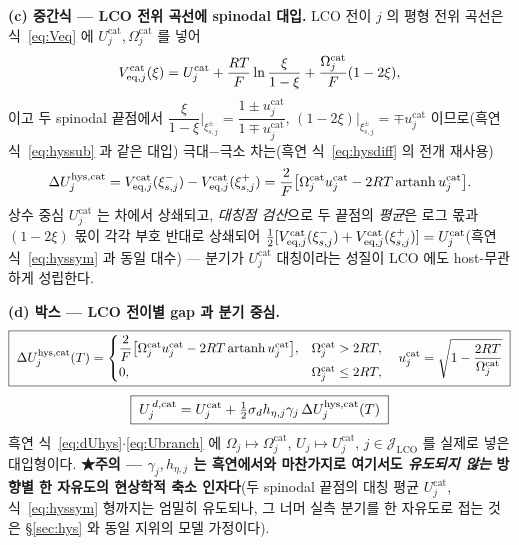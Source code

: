 \textbf{(c) 중간식 --- LCO 전위 곡선에 spinodal 대입.}
LCO 전이 $j$ 의 평형 전위 곡선은 식~\eqref{eq:Veq} 에 $U_j^\mathrm{cat},\Omega_j^\mathrm{cat}$ 를 넣어
\begin{equation}
V_{\mathrm{eq},j}^\mathrm{cat}(\xi)=U_j^\mathrm{cat}
+\frac{RT}{F}\ln\frac{\xi}{1-\xi}+\frac{\Omega_j^\mathrm{cat}}{F}(1-2\xi),
\label{eq:lco-Veq}
\end{equation}
이고 두 spinodal 끝점에서 $\dfrac{\xi}{1-\xi}\Big|_{\xi_{s,j}^\pm}=\dfrac{1\pm u_j^\mathrm{cat}}{1\mp
u_j^\mathrm{cat}}$, $(1-2\xi)\big|_{\xi_{s,j}^\pm}=\mp u_j^\mathrm{cat}$ 이므로(흑연 식~\eqref{eq:hyssub}
과 같은 대입) 극대$-$극소 차는(흑연 식~\eqref{eq:hysdiff} 의 전개 재사용)
\[
\Delta U_{j}^{\mathrm{hys},\mathrm{cat}}=V_{\mathrm{eq},j}^\mathrm{cat}(\xi_{s,j}^-)-V_{\mathrm{eq},j}^\mathrm{cat}(\xi_{s,j}^+)
=\frac{2}{F}\big[\Omega_j^\mathrm{cat}u_j^\mathrm{cat}-2RT\,\mathrm{artanh}\,u_j^\mathrm{cat}\big].
\]
상수 중심 $U_j^\mathrm{cat}$ 는 차에서 상쇄되고, \emph{대칭점 검산}으로 두 끝점의 \emph{평균}은 로그 몫과
$(1-2\xi)$ 몫이 각각 부호 반대로 상쇄되어 $\tfrac12[V_{\mathrm{eq},j}^\mathrm{cat}(\xi_{s,j}^-)
+V_{\mathrm{eq},j}^\mathrm{cat}(\xi_{s,j}^+)]=U_j^\mathrm{cat}$(흑연 식~\eqref{eq:hyssym} 과 동일 대수) ---
분기가 $U_j^\mathrm{cat}$ 대칭이라는 성질이 LCO 에도 host-무관하게 성립한다.

\textbf{(d) 박스 --- LCO 전이별 gap 과 분기 중심.}
\begin{equation}
\boxed{\;
\Delta U_j^{\mathrm{hys},\mathrm{cat}}(T)=
\begin{cases}
\dfrac{2}{F}\big[\Omega_j^\mathrm{cat}u_j^\mathrm{cat}-2RT\,\mathrm{artanh}\,u_j^\mathrm{cat}\big],
& \Omega_j^\mathrm{cat}>2RT,\\[4pt]
0, & \Omega_j^\mathrm{cat}\le2RT,
\end{cases}
\quad u_j^\mathrm{cat}=\sqrt{1-\dfrac{2RT}{\Omega_j^\mathrm{cat}}}\;}
\label{eq:lco-dUhys}
\end{equation}
\begin{equation}
\boxed{\;
U_j^{\,d,\mathrm{cat}}=U_j^\mathrm{cat}
+\tfrac12\sigma_d h_{\eta,j}\gamma_j\,\Delta U_j^{\mathrm{hys},\mathrm{cat}}(T)\;}
\label{eq:lco-Ubranch}
\end{equation}
흑연 식~\eqref{eq:dUhys}$\cdot$\eqref{eq:Ubranch} 에 $\Omega_j\mapsto\Omega_j^\mathrm{cat}$,
$U_j\mapsto U_j^\mathrm{cat}$, $j\in\mathcal J_\mathrm{LCO}$ 를 실제로 넣은 대입형이다. \textbf{★주의 --- $\gamma_j,h_{\eta,j}$ 는 흑연에서와 마찬가지로 여기서도
\emph{유도되지 않는} 방향별 한 자유도의 현상학적 축소 인자다}(두 spinodal 끝점의 대칭 평균
$U_j^\mathrm{cat}$, 식~\eqref{eq:hyssym} 형까지는 엄밀히 유도되나, 그 너머 실측 분기를 한 자유도로 접는
것은 \S\ref{sec:hys} 와 동일 지위의 모델 가정이다).

